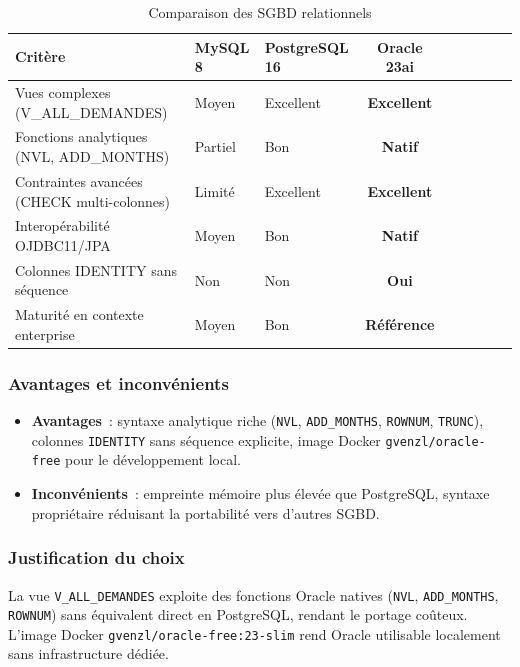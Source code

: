 \begin{table}[H]
\centering
\caption{Comparaison des SGBD relationnels}
\label{tab:cmp_sgbd}
\begin{tabularx}{\textwidth}{VlVCVCVCV}
\hline
\textbf{Critère} & \textbf{MySQL 8} & \textbf{PostgreSQL 16} & \textbf{Oracle 23ai} \\
\hline
Vues complexes (V\_ALL\_DEMANDES) & Moyen & Excellent & \textbf{Excellent} \\
\hline
Fonctions analytiques (NVL, ADD\_MONTHS) & Partiel & Bon & \textbf{Natif} \\
\hline
Contraintes avancées (CHECK multi-colonnes) & Limité & Excellent & \textbf{Excellent} \\
\hline
Interopérabilité OJDBC11/JPA & Moyen & Bon & \textbf{Natif} \\
\hline
Colonnes IDENTITY sans séquence & Non & Non & \textbf{Oui} \\
\hline
Maturité en contexte enterprise & Moyen & Bon & \textbf{Référence} \\
\hline
\end{tabularx}
\end{table}

\subsubsection*{Avantages et inconvénients}

\begin{itemize}[leftmargin=*,nosep]
  \item \textbf{Avantages}~: syntaxe analytique riche (\texttt{NVL},
        \texttt{ADD\_MONTHS}, \texttt{ROWNUM}, \texttt{TRUNC}), colonnes
        \texttt{IDENTITY} sans séquence explicite, image Docker
        \texttt{gvenzl/oracle-free} pour le développement local.
  \item \textbf{Inconvénients}~: empreinte mémoire plus élevée que PostgreSQL,
        syntaxe propriétaire réduisant la portabilité vers d'autres SGBD.
\end{itemize}

\subsubsection*{Justification du choix}

La vue \texttt{V\_ALL\_DEMANDES} exploite des fonctions Oracle natives (\texttt{NVL}, \texttt{ADD\_MONTHS}, \texttt{ROWNUM}) sans équivalent direct en PostgreSQL, rendant le portage coûteux. L'image Docker \texttt{gvenzl/oracle-free:23-slim} rend Oracle utilisable localement sans infrastructure dédiée.

